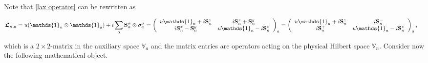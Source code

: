 \documentclass{homework}
\begin{document}
 Note that \cref{lax operator} can be rewritten as 

\begin{equation}
    \begin{split}
    \bm{\mathcal{L}}_{n, a} &= u(\mathds{1}_n \otimes \mathds{1}_a) + i \sum_{\alpha} \spin_n^\alpha \otimes \sigma_{a}^\alpha 
    = \left(\begin{array}{cc}
       u \mathds{1}_n + i \spin^{z}_{n} & i \spin^{x}_{n} + \spin^{y}_{n} \\
       i \spin^{x}_{n} - \spin^{y}_{n}  & u \mathds{1}_n - i \spin^{z}_{n}
    \end{array}\right)_a = \left(\begin{array}{cc}
       u \mathds{1}_n + i \spin^{z}_{n} & i \spin^{-}_{n} \\
       i \spin^{+}_{n} & u \mathds{1}_n - i \spin^{z}_{n}
    \end{array}\right)_a,
    \end{split}
\end{equation}
    
which is a $2 \times 2$-matrix in the auxiliary space $\mathds{V}_a$ and the matrix entries are operators acting on the physical Hilbert space $\mathds{V}_n$. Consider now the following mathematical object. 
\end{document}
